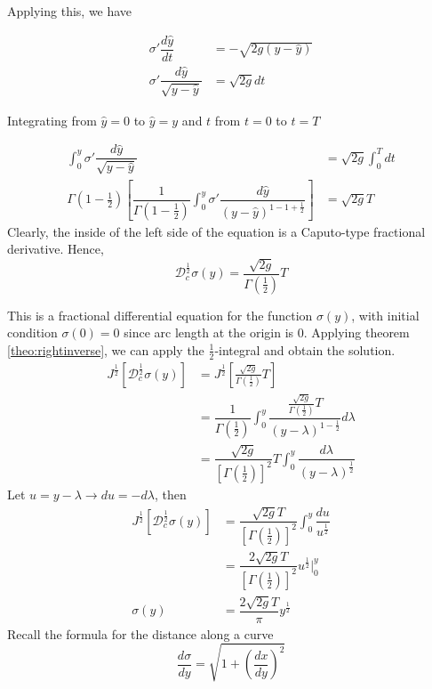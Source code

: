     Applying this, we have
    
    \begin{align*}
        \sigma'\dfrac{d\hat{y}}{dt} &= -\sqrt{2g(y-\hat{y})}\\
        \sigma'\dfrac{d\hat{y}}{\sqrt{y-\hat{y}}}&=\sqrt{2g}dt
    \end{align*}
    
    Integrating from $\hat{y}=0$ to $\hat{y}=y$ and $t$ from $t=0$ to $t=T$
    
    \begin{align*}
        \int_0^y \sigma'\dfrac{d\hat{y}}{\sqrt{y-\hat{y}}} &= \sqrt{2g}\int_0^Tdt\\
        \Gamma\left(1-\frac{1}{2}\right)\left[
        \dfrac{1}{\Gamma\left(1-\frac{1}{2}\right)}\int_0^y\sigma'\dfrac{d\hat{y}}{(y-\hat{y})^{1-1+\frac{1}{2}}}\right] &= \sqrt{2g}T
    \end{align*}
    Clearly, the inside of the left side of the equation is a Caputo-type fractional derivative. Hence,
    \begin{equation}
        \mathcal { D } _ { c } ^ { \frac { 1 } { 2 } } \sigma ( y ) = \frac { \sqrt { 2 g } } { \Gamma \left( \frac { 1 } { 2 } \right) } T
    \end{equation}
    
    This is a fractional differential equation for the function $\sigma(y)$, with initial condition $\sigma(0)=0$ since arc length at the origin is 0.
    Applying theorem \ref{theo:rightinverse}, we can apply the $\frac{1}{2}$-integral and obtain the solution. 
    \begin{align*}
        J^{\frac{1}{2}} \left[\mathcal { D } _ { c } ^ { \frac { 1 } { 2 } } \sigma ( y )\right] &= J^{\frac{1}{2}} \left[\frac { \sqrt { 2 g } } { \Gamma \left( \frac { 1 } { 2 } \right) } T \right] \\
        &= \dfrac{1}{\Gamma\left(\frac{1}{2}\right)}\int_0^y \dfrac{\frac { \sqrt { 2 g } } { \Gamma \left( \frac { 1 } { 2 } \right) } T}{(y-\lambda)^{1-\frac{1}{2}}}d\lambda\\
        &= \dfrac{\sqrt{2g}}{\left[\Gamma\left(\frac{1}{2}\right)\right]^2}T\int_0^y\dfrac{d\lambda}{(y-\lambda)^{\frac{1}{2}}}
    \end{align*}
    Let $u=y-\lambda\rightarrow du = -d\lambda$, then
    \begin{align*}
        J^{\frac{1}{2}} \left[\mathcal { D } _ { c } ^ { \frac { 1 } { 2 } } \sigma ( y )\right] &= \dfrac{\sqrt{2g}T}{\left[\Gamma\left(\frac{1}{2}\right)\right]^2}\int_0^y \dfrac{du}{u^{\frac{1}{2}}}\\
        &= \dfrac{2\sqrt{2g}T}{\left[\Gamma\left(\frac{1}{2}\right)\right]^2}u^{\frac{1}{2}}\bigg\rvert_0^y\\
        \sigma(y)&= \dfrac{2\sqrt{2g}T}{\pi}y^{\frac{1}{2}}
    \end{align*}
    Recall the formula for the distance along a curve
    \begin{equation}
        \dfrac{d\sigma}{dy}=\sqrt{1+\left(\dfrac{dx}{dy}\right)^2}
    \end{equation}
    
